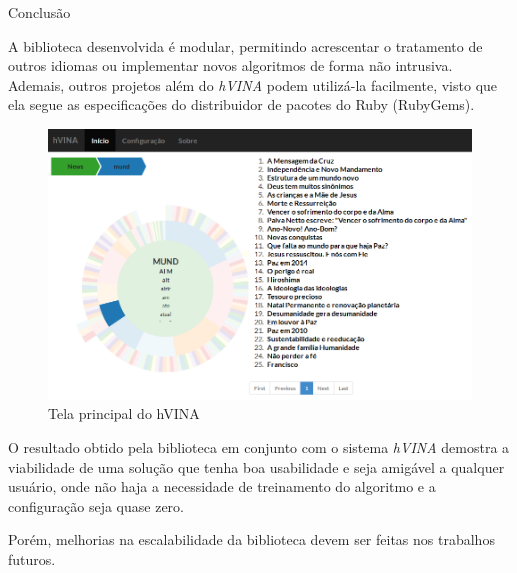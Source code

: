 \documentclass[final]{beamer}
\newlength{\onecolwid}
\begin{document}
\begin{frame}[t]
\begin{columns}[t]
\begin{column}{\onecolwid} %


\begin{block}{Conclusão}

A biblioteca desenvolvida é modular, permitindo acrescentar o tratamento de outros idiomas ou implementar novos algoritmos de forma não intrusiva. Ademais, outros projetos além do \textit{hVINA} podem utilizá-la facilmente, visto que ela segue as especificações do distribuidor de pacotes do Ruby (RubyGems).

\begin{figure}
\includegraphics[width=1\linewidth]{hvina.png}
\caption{Tela principal do hVINA}
\end{figure}

O resultado obtido pela biblioteca em conjunto com o sistema \textit{hVINA} demostra a viabilidade de uma solução que tenha boa usabilidade e seja amigável a qualquer usuário, onde não haja a necessidade de treinamento do algoritmo e a configuração seja quase zero.

Porém, melhorias na escalabilidade da biblioteca devem ser feitas nos trabalhos futuros.

\end{block}



\end{column}
\end{columns}
\end{frame}
\end{document}
